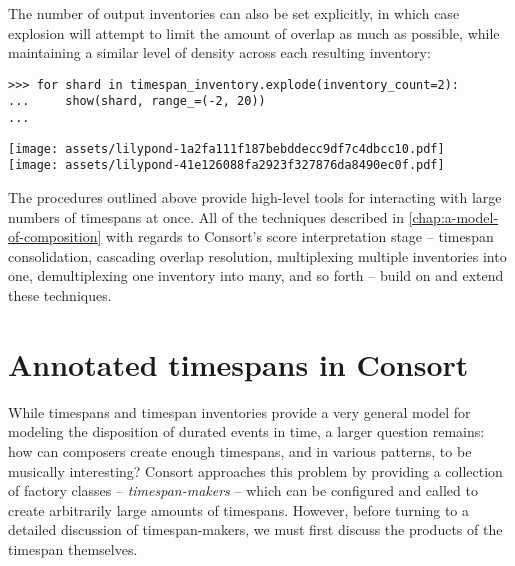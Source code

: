 \noindent The number of output inventories can also be set explicitly, in which
case explosion will attempt to limit the amount of overlap as much as possible,
while maintaining a similar level of density across each resulting inventory:

\begin{comment}
<abjad>
for shard in timespan_inventory.explode(inventory_count=2):
    show(shard, range_=(-2, 20))

</abjad>
\end{comment}

\begin{abjadbookoutput}
\begin{singlespacing}
\vspace{-0.5\baselineskip}
\begin{lstlisting}
>>> for shard in timespan_inventory.explode(inventory_count=2):
...     show(shard, range_=(-2, 20))
...
\end{lstlisting}
\noindent\texttt{[image: assets/lilypond-1a2fa111f187bebddecc9df7c4dbcc10.pdf]}\\
\noindent\texttt{[image: assets/lilypond-41e126088fa2923f327876da8490ec0f.pdf]}
\end{singlespacing}
\end{abjadbookoutput}

The procedures outlined above provide high-level tools for interacting with
large numbers of timespans at once. All of the techniques described in
\autoref{chap:a-model-of-composition} with regards to Consort's score
interpretation stage -- timespan consolidation, cascading overlap
resolution, multiplexing multiple inventories into one, demultiplexing one
inventory into many, and so forth -- build on and extend these techniques.

\section{Annotated timespans in Consort}
\label{sec:annotated-timespans-in-consort}

While timespans and timespan inventories provide a very general model for
modeling the disposition of durated events in time, a larger question remains:
how can composers create enough timespans, and in various patterns, to be
musically interesting? Consort approaches this problem by providing a
collection of factory classes -- \emph{timespan-makers} -- which can be
configured and called to create arbitrarily large amounts of timespans.
However, before turning to a detailed discussion of timespan-makers, we must
first discuss the products of the timespan themselves.

